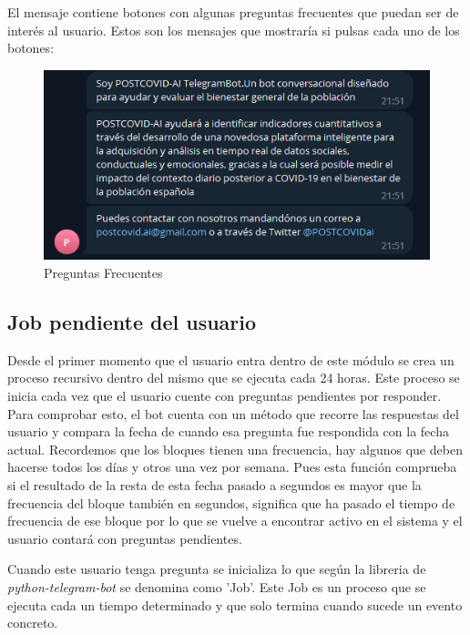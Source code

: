 El mensaje contiene botones con algunas preguntas frecuentes que puedan ser de interés al usuario. Estos son los mensajes que mostraría si pulsas cada uno de los botones:

\begin{figure}[!ht]
    \centering
    \includegraphics[width=1\textwidth]{imagenes/preguntas_frecuentes.png}
    \caption{ Preguntas Frecuentes }
    \label{fig:enter-label}
\end{figure}\vspace{0.3cm}

\subsection{Job pendiente del usuario}

Desde el primer momento que el usuario entra dentro de este módulo se crea un proceso recursivo dentro del mismo que se ejecuta cada 24 horas. Este proceso se inicia cada vez que el usuario cuente con preguntas pendientes por responder. Para comprobar esto, el bot cuenta con un método que recorre las respuestas del usuario y compara la fecha de cuando esa pregunta fue respondida con la fecha actual. Recordemos que los bloques tienen una frecuencia, hay algunos que deben hacerse todos los días y otros una vez por semana. Pues esta función comprueba si el resultado de la resta de esta fecha pasado a segundos es mayor que la frecuencia del bloque también en segundos, significa que ha pasado el tiempo de frecuencia de ese bloque por lo que se vuelve a encontrar activo en el sistema y el usuario contará con preguntas pendientes. 

Cuando este usuario tenga pregunta se inicializa lo que según la libreria de \textit{python-telegram-bot} se denomina como 'Job'. Este Job es un proceso que se ejecuta cada un tiempo determinado y que solo termina cuando sucede un evento concreto. 

